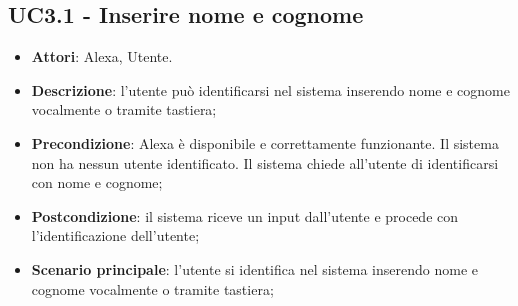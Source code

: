 \documentclass[../AnalisiDeiRequisiti_v4.0.0.tex]{subfiles}
\begin{document}
\subsection{UC3.1 - Inserire nome e cognome} 
\label{sssec:UC3.1} 
\begin{itemize} 
\item \textbf{Attori}: Alexa, Utente.
\item \textbf{Descrizione}: l'utente può identificarsi nel sistema inserendo nome e cognome vocalmente o tramite tastiera;
\item \textbf{Precondizione}: Alexa è disponibile e correttamente funzionante. Il sistema non ha nessun utente identificato. Il sistema chiede all'utente di identificarsi con nome e cognome;
\item \textbf{Postcondizione}: il sistema riceve un input dall'utente e procede con l'identificazione dell'utente;
\item \textbf{Scenario principale}: l'utente si identifica nel sistema inserendo nome e cognome vocalmente o tramite tastiera;
\end{itemize} 
\end{document}
